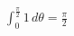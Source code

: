 \documentclass[preview]{standalone}
\begin{document}
\begin{align*}
\int_0^{\frac{\pi}{2}} 1 \, d\theta = \frac{\pi}{2}
\end{align*}
\end{document}
